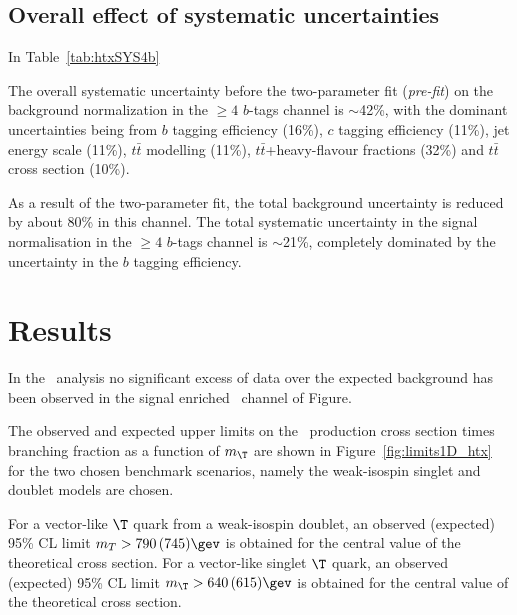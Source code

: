 \subsection{Overall effect of systematic uncertainties}\label{sec:wbxALLSYS}

In Table~\ref{tab:htxSYS4b}
\begin{table}[h!tb]
\begin{center}
\resizebox{1.\textwidth}{!}{
}
\caption{\label{tab:htxSYS4b} }
\end{center}
\end{table}

The overall systematic uncertainty before the two-parameter fit ({\it pre-fit})
on the background normalization in the $\geq 4$ $b$-tags channel is 
$\sim$42\%, with the dominant uncertainties being from $b$ tagging efficiency (16\%),
$c$ tagging efficiency (11\%), jet energy scale (11\%), $t\bar{t}$ modelling (11\%), 
$t\bar{t}$+heavy-flavour fractions (32\%) and $t\bar{t}$ cross section (10\%).

As a result of the two-parameter fit, the total background uncertainty is reduced 
by about 80\% in this channel. The total  systematic uncertainty
in the signal normalisation in the $\geq 4$ $b$-tags channel is 
$\sim$21\%, completely dominated by the uncertainty in the $b$ tagging efficiency.








\section{Results}\label{sec:htxRES}

In the \htx\ analysis no significant excess of data over the 
expected background has been observed in the signal enriched 
\chiv\ channel of Figure.

The observed and expected upper limits on the \TTbar\ production cross section 
times branching fraction as a function of $m_{\T}$ are shown in 
Figure~\ref{fig:limits1D_htx} for the two chosen benchmark scenarios,
namely the weak-isospin singlet and
doublet models are chosen.

For a vector-like $\T$ quark from a weak-isospin doublet, an observed (expected) 95\%  CL  limit
$m_{T}>790\,(745)\gev$ is obtained for the central value of the 
theoretical cross section.
For a vector-like singlet $\T$ quark, an observed (expected) 95\%  CL  limit 
$m_{\T}>640\,(615)\gev$ is obtained for the central value of the 
theoretical cross section.

